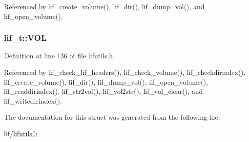 Referenced by lif\+\_\+create\+\_\+volume(), lif\+\_\+dir(), lif\+\_\+dump\+\_\+vol(), and lif\+\_\+open\+\_\+volume().

\subsubsection[{\texorpdfstring{V\+OL}{VOL}}]{ lif\+\_\+t\+::\+V\+OL}\hypertarget{structlif__t_ae68126d2b9261ef9a6903a95d5c82cac}{}\label{structlif__t_ae68126d2b9261ef9a6903a95d5c82cac}


Definition at line 136 of file lifutils.\+h.



Referenced by lif\+\_\+check\+\_\+lif\+\_\+headers(), lif\+\_\+check\+\_\+volume(), lif\+\_\+checkdirindex(), lif\+\_\+create\+\_\+volume(), lif\+\_\+dir(), lif\+\_\+dump\+\_\+vol(), lif\+\_\+open\+\_\+volume(), lif\+\_\+readdirindex(), lif\+\_\+str2vol(), lif\+\_\+vol2str(), lif\+\_\+vol\+\_\+clear(), and lif\+\_\+writedirindex().



The documentation for this struct was generated from the following file\+:\begin{DoxyCompactItemize}
\item 
lif/\hyperlink{lifutils_8h}{lifutils.\+h}\end{DoxyCompactItemize}
